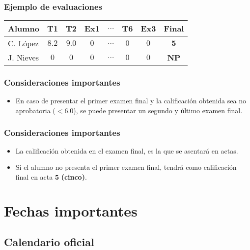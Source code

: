 \documentclass[12pt]{beamer}
\begin{document}
\begin{frame}
\frametitle{Ejemplo de evaluaciones}
\fontsize{12}{12}\selectfont
\begin{table}
\begin{tabular}{| l | c | c | c | c | c | c | c |} \hline
Alumno & T1 & T2 & Ex1 &  $\ldots$ &  T6 & Ex3 & Final \\ \hline
C. López & $8.2$ & $9.0$ & $0$ & $\ldots$ & $0$ & $0$ & $\mathbf{5}$ \pause \\ \hline 
J. Nieves & $0$ & $0$ & $0$& $\ldots$ & $0$ & $0$ & \textbf{NP} \\ \hline
\end{tabular}
\end{table}
\end{frame}
\begin{frame}
\frametitle{Consideraciones importantes}
\begin{itemize}[<+->]
\setlength{\itemsep}{0mm}
\item En caso de presentar el primer examen final y la calificación obtenida sea no aprobatoria ($<6.0$), se puede presentar un segundo y último examen final.
\end{itemize}
\end{frame}
\begin{frame}
\frametitle{Consideraciones importantes}
\begin{itemize}[<+->]
\setlength{\itemsep}{0mm}
\item La calificación obtenida en el examen final, es la que se asentará en actas.
\item Si el alumno no presenta el primer examen final, tendrá como calificación final en acta $\mathbf{5}$ \textbf{(cinco)}. 
\end{itemize}
\end{frame}


\section{Fechas importantes}
\subsection{Calendario oficial}
\end{document}
